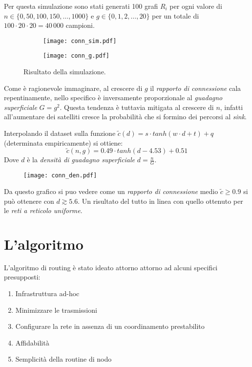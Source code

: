 \documentclass[a4paper,12pt]{article}
\theoremstyle{definition}
\begin{document}
Per questa simulazione sono stati generati 100 grafi $R_i$ per ogni valore di $n \in \{0, 50, 100, 150, \dots, 1000\}$ e $g \in \{0, 1, 2, \dots, 20\}$ per un totale di $100 \cdot 20 \cdot 20 = 40\,000$ campioni.

\begin{figure}[H]
\begin{subfigure}[b]{0.5\textwidth}
\texttt{[image: conn\_sim.pdf]}
\caption{}
\end{subfigure}
\begin{subfigure}[b]{0.5\textwidth}
\texttt{[image: conn\_g.pdf]}
\caption{}
\end{subfigure}
\caption{Risultato della simulazione.}%
\end{figure}

Come è ragionevole immaginare, al crescere di $g$ il \emph{rapporto di connessione} cala repentinamente, nello specifico è inversamente proporzionale al \emph{guadagno superficiale} $G = g^2$. Questa tendenza è tuttavia mitigata al crescere di $n$, infatti all'aumentare dei satelliti cresce la probabilità che si formino dei percorsi al \emph{sink}.

Interpolando il dataset sulla funzione $\tilde{c}(d) = s \cdot tanh(w \cdot d + t) + q$ (determinata empiricamente) si ottiene:
\begin{displaymath}
\tilde{c}(n, g) = 0.49 \cdot tanh(d - 4.53) + 0.51
\end{displaymath}
Dove $d$ è la \emph{densità di guadagno superficiale} $d = \frac{n}{G}$.

\begin{figure}[H]
\centering
\texttt{[image: conn\_den.pdf]}
\caption{}
\end{figure}

Da questo grafico si puo vedere come un \emph{rapporto di connessione} medio $\tilde{c} \geq 0.9$ si può ottenere con $d \gtrsim 5.6$. Un risultato del tutto in linea con quello ottenuto per le \emph{reti a reticolo uniforme}.

\section{L'algoritmo}

L'algoritmo di routing è stato ideato attorno attorno ad alcuni specifici presupposti:

\begin{enumerate}
\item Infrastruttura ad-hoc
\item Minimizzare le trasmissioni
\item Configurare la rete in assenza di un coordinamento prestabilito
\item Affidabilità
\item Semplicità della routine di nodo
\end{enumerate}
\end{document}
